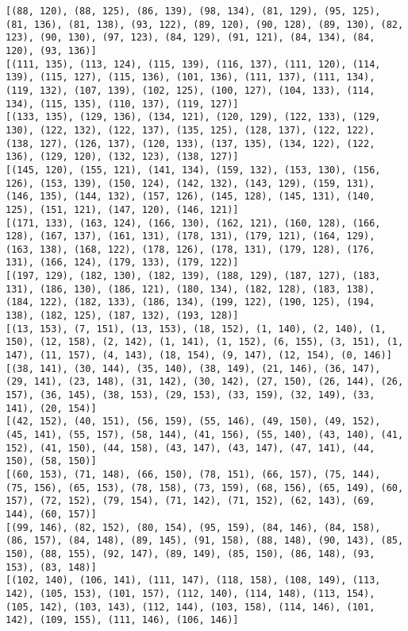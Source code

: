 \documentclass[11pt]{article}
\begin{document}
\begin{Verbatim}[commandchars=\\\{\}]
[(88, 120), (88, 125), (86, 139), (98, 134), (81, 129), (95, 125), (81, 136), (81, 138), (93, 122), (89, 120), (90, 128), (89, 130), (82, 123), (90, 130), (97, 123), (84, 129), (91, 121), (84, 134), (84, 120), (93, 136)]
[(111, 135), (113, 124), (115, 139), (116, 137), (111, 120), (114, 139), (115, 127), (115, 136), (101, 136), (111, 137), (111, 134), (119, 132), (107, 139), (102, 125), (100, 127), (104, 133), (114, 134), (115, 135), (110, 137), (119, 127)]
[(133, 135), (129, 136), (134, 121), (120, 129), (122, 133), (129, 130), (122, 132), (122, 137), (135, 125), (128, 137), (122, 122), (138, 127), (126, 137), (120, 133), (137, 135), (134, 122), (122, 136), (129, 120), (132, 123), (138, 127)]
[(145, 120), (155, 121), (141, 134), (159, 132), (153, 130), (156, 126), (153, 139), (150, 124), (142, 132), (143, 129), (159, 131), (146, 135), (144, 132), (157, 126), (145, 128), (145, 131), (140, 125), (151, 121), (147, 120), (146, 121)]
[(171, 133), (163, 124), (166, 130), (162, 121), (160, 128), (166, 128), (167, 137), (161, 131), (178, 131), (179, 121), (164, 129), (163, 138), (168, 122), (178, 126), (178, 131), (179, 128), (176, 131), (166, 124), (179, 133), (179, 122)]
[(197, 129), (182, 130), (182, 139), (188, 129), (187, 127), (183, 131), (186, 130), (186, 121), (180, 134), (182, 128), (183, 138), (184, 122), (182, 133), (186, 134), (199, 122), (190, 125), (194, 138), (182, 125), (187, 132), (193, 128)]
[(13, 153), (7, 151), (13, 153), (18, 152), (1, 140), (2, 140), (1, 150), (12, 158), (2, 142), (1, 141), (1, 152), (6, 155), (3, 151), (1, 147), (11, 157), (4, 143), (18, 154), (9, 147), (12, 154), (0, 146)]
[(38, 141), (30, 144), (35, 140), (38, 149), (21, 146), (36, 147), (29, 141), (23, 148), (31, 142), (30, 142), (27, 150), (26, 144), (26, 157), (36, 145), (38, 153), (29, 153), (33, 159), (32, 149), (33, 141), (20, 154)]
[(42, 152), (40, 151), (56, 159), (55, 146), (49, 150), (49, 152), (45, 141), (55, 157), (58, 144), (41, 156), (55, 140), (43, 140), (41, 152), (41, 150), (44, 158), (43, 147), (43, 147), (47, 141), (44, 150), (58, 150)]
[(60, 153), (71, 148), (66, 150), (78, 151), (66, 157), (75, 144), (75, 156), (65, 153), (78, 158), (73, 159), (68, 156), (65, 149), (60, 157), (72, 152), (79, 154), (71, 142), (71, 152), (62, 143), (69, 144), (60, 157)]
[(99, 146), (82, 152), (80, 154), (95, 159), (84, 146), (84, 158), (86, 157), (84, 148), (89, 145), (91, 158), (88, 148), (90, 143), (85, 150), (88, 155), (92, 147), (89, 149), (85, 150), (86, 148), (93, 153), (83, 148)]
[(102, 140), (106, 141), (111, 147), (118, 158), (108, 149), (113, 142), (105, 153), (101, 157), (112, 140), (114, 148), (113, 154), (105, 142), (103, 143), (112, 144), (103, 158), (114, 146), (101, 142), (109, 155), (111, 146), (106, 146)]

\end{Verbatim}
\end{document}
